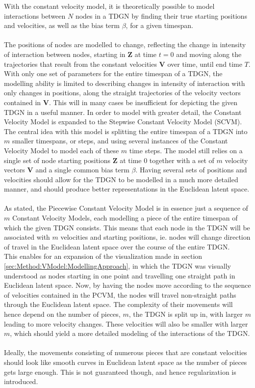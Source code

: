 With the constant velocity model, it is theoretically possible to model interactions between $N$ nodes in a TDGN by finding their true starting positions and velocities, as well as the bias term $\beta$, for a given timespan.
\\\\
The positions of nodes are modelled to change, reflecting the change in intensity of interaction between nodes, starting in $\textbf{Z}$ at time $t=0$ and moving along the trajectories that result from the constant velocities $\textbf{V}$ over time, until end time $T$.
With only one set of parameters for the entire timespan of a TDGN, the modelling ability is limited to describing changes in intensity of interaction with only changes in positions, along the straight trajectories of the velocity vectors contained in $\textbf{V}$.
This will in many cases be insufficient for depicting the given TDGN in a useful manner. 
In order to model with greater detail, the Constant Velocity Model is expanded to the Stepwise Constant Velocity Model (SCVM). 
The central idea with this model is splitting the entire timespan of a TDGN into $m$ smaller timespans, or steps, and using several instances of the Constant Velocity Model to model each of these $m$ time steps. The model still relies on a single set of node starting positions $\textbf{Z}$ at time 0 together with a set of $m$ velocity vectors $\textbf{V}$ and a single common bias term $\beta$.
Having several sets of positions and velocities should allow for the TDGN to be modelled in a much more detailed manner, and should produce better representations in the Euclidean latent space.
\\\\
As stated, the Piecewise Constant Velocity Model is in essence just a sequence of $m$ Constant Velocity Models, each modelling a piece of the entire timespan of which the given TDGN consists. 
This means that each node in the TDGN will be associated with $m$ velocities and starting positions, ie. nodes will change direction of travel in the Euclidean latent space over the course of the entire TDGN.
\\
This enables for an expansion of the visualization made in section \ref{sec:Method:VModel:ModellingApproach}, in which the TDGN was visually understood as nodes starting in one point and travelling one straight path in Euclidean latent space.
Now, by having the nodes move according to the sequence of velocities contained in the PCVM, the nodes will travel non-straight paths through the Euclidean latent space.
The complexity of their movements will hence depend on the number of pieces, $m$, the TDGN is split up in, with larger $m$ leading to more velocity changes.
These velocities will also be smaller with larger $m$, which should yield a more detailed modeling of the interactions of the TDGN.
\\\\
Ideally, the movements consisting of numerous pieces that are constant velocities should look like smooth curves in Euclidean latent space as the number of pieces gets large enough.
This is not guaranteed though, and hence regularization is introduced.


